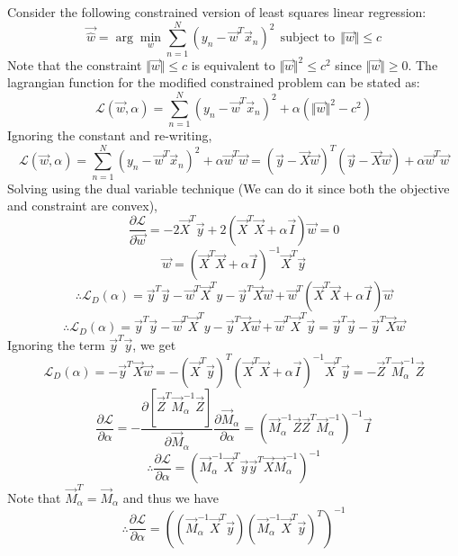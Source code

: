 \documentclass[a4paper,11pt]{article}
\begin{document}
\begin{mlsolution}
Consider the following constrained version of least squares linear regression:
\[
\vec{\hat{w}} = \arg\min_{w} \sum_{n=1}^{N}\left( y_n - \vec{w}^{T}\vec{x}_n \right) ^{2} \ \ \text{subject to} \ \ \Vert\vec{w}\Vert \leq c
\]
Note that the constraint $\Vert\vec{w}\Vert \leq c$ is equivalent to $\Vert\vec{w}\Vert^{2} \leq c^{2}$ since $\Vert\vec{w}\Vert \geq 0$.
The lagrangian function for the modified constrained problem can be stated as:
\[
\mathcal{L}(\vec{w}, \alpha) = \sum_{n=1}^{N}\left( y_n - \vec{w}^{T}\vec{x}_n \right) ^{2} + \alpha(\Vert\vec{w}\Vert^{2} - c^2)
\]
Ignoring the constant and re-writing,
\[
\mathcal{L}(\vec{w}, \alpha) = \sum_{n=1}^{N}\left( y_n - \vec{w}^{T}\vec{x}_n \right) ^{2} + \alpha\vec{w}^{T}\vec{w} = (\vec{y} - \vec{X}\vec{w})^{T}(\vec{y} - \vec{X}\vec{w}) + \alpha \vec{w}^{T}\vec{w}
\]
Solving using the dual variable technique (We can do it since both the objective and constraint are convex),
\[
\frac{\partial \mathcal{L}}{\partial \vec{w}} = -2\vec{X}^{T}\vec{y} + 2(\vec{X}^T\vec{X} + \alpha \vec{I})\vec{w} = 0
\]
\[
\boxed{\vec{w} = \left( \vec{X}^T\vec{X} + \alpha \vec{I} \right) ^{-1}\vec{X}^{T}\vec{y}}
\]
\[
\therefore \mathcal{L}_D(\alpha) = \vec{y}^T\vec{y} - \vec{w}^T\vec{X}^{T}y - \vec{y}^{T}\vec{X}\vec{w} + \vec{w}^{T}(\vec{X}^{T}\vec{X}+\alpha\vec{I})\vec{w}
\]
\[
\therefore \mathcal{L}_D(\alpha) = \vec{y}^T\vec{y} - \vec{w}^T\vec{X}^{T}y - \vec{y}^{T}\vec{X}\vec{w} + \vec{w}^{T}\vec{X}^{T}\vec{y} = \vec{y}^T\vec{y} - \vec{y}^{T}\vec{X}\vec{w}
\]
Ignoring the term $\vec{y}^T\vec{y}$, we get
\[
\mathcal{L}_D(\alpha) = -\vec{y}^{T}\vec{X}\vec{w} = - (\vec{X}^T\vec{y})^{T}\left(  \vec{X}^T\vec{X} + \alpha \vec{I} \right)^{-1}\vec{X}^{T}\vec{y} = -\vec{Z}^{T}\vec{M}^{-1}_\alpha\vec{Z}
\]
\[
\frac{\partial \mathcal{L}}{\partial \alpha} = -\frac{\partial [\vec{Z}^{T}\vec{M}^{-1}_\alpha\vec{Z}]}{\partial \vec{M}_\alpha}\frac{\partial \vec{M}_\alpha}{\partial \alpha} = (\vec{M}^{-1}_\alpha\vec{Z}\vec{Z}^{T}\vec{M}^{-1}_\alpha)^{-1}\vec{I}
\]
\[
\therefore \frac{\partial \mathcal{L}}{\partial \alpha} = (\vec{M}^{-1}_\alpha \vec{X}^{T}\vec{y}\vec{y}^{T}\vec{X} \vec{M}^{-1}_\alpha)^{-1}
\]
Note that $\vec{M}^{T}_\alpha = \vec{M}_\alpha$ and thus we have
\[
\therefore \frac{\partial \mathcal{L}}{\partial \alpha} = ((\vec{M}^{-1}_\alpha \vec{X}^{T}\vec{y})(\vec{M}^{-1}_\alpha \vec{X}^{T}\vec{y})^{T})^{-1}
\]
\end{mlsolution}
\end{document}
